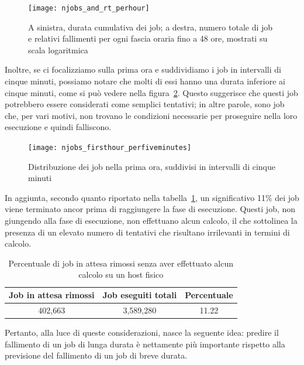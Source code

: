 \begin{figure}[p]
    \centering
    \texttt{[image: njobs\_and\_rt\_perhour]}
    \caption{\small A sinistra, durata cumulativa dei job; a destra, numero
    totale di job e relativi fallimenti per ogni fascia oraria fino a 48 ore,
mostrati su scala logaritmica}
    \label{fig:njobs_and_rt_perhour}
\end{figure}

Inoltre, se ci focalizziamo sulla prima ora e suddividiamo i job in intervalli
di cinque minuti, possiamo notare che molti di essi hanno una durata inferiore
ai cinque minuti, come si può vedere nella figura~\ref{fig:jobs_firsthour}.
Questo suggerisce che questi job potrebbero essere considerati come semplici
tentativi; in altre parole, sono job che, per vari motivi, non trovano le
condizioni necessarie per proseguire nella loro esecuzione e quindi
falliscono.

\begin{figure}[p]
   \centering
   \texttt{[image: njobs\_firsthour\_perfiveminutes]}
   \caption{\small Distribuzione dei job nella prima ora, suddivisi in intervalli di
   cinque minuti}
   \label{fig:jobs_firsthour}
\end{figure}

In aggiunta, secondo quanto riportato nella
tabella~\ref{table:pending_jobs_removed}, un significativo 11\% dei job viene
terminato ancor prima di raggiungere la fase di esecuzione. Questi job, non
giungendo alla fase di esecuzione, non effettuano alcun calcolo, il che
sottolinea la presenza di un elevato numero di tentativi che risultano
irrilevanti in termini di calcolo.

\begin{table}[!ht]
    \caption{Percentuale di job in attesa rimossi senza aver effettuato alcun
    calcolo su un host fisico}
    \centering
    \begin{tabular}{ccc}
        \toprule
        \textbf{Job in attesa rimossi} & \textbf{Job eseguiti totali} &
        \textbf{Percentuale} \\
        \midrule
        402,663 & 3,589,280 & 11.22 \\
        \bottomrule
    \end{tabular}
    \label{table:pending_jobs_removed}
\end{table}

Pertanto, alla luce di queste considerazioni, nasce la seguente idea: predire
il fallimento di un job di lunga durata è nettamente più importante rispetto
alla previsione del fallimento di un job di breve durata.

